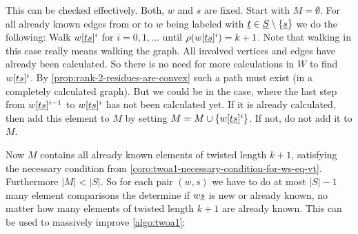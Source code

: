 This can be checked effectively. Both, $w$ and $s$ are fixed. Start with $M = \emptyset$. For all already known edges from or to $w$ being labeled with $\underline{t} \in \underline{S} \setminus \{\underline{s}\}$ we do the following: Walk $w[\underline{t} \underline{s}]^i$ for $i = 0,1,\ldots$ until $\rho(w[\underline{t} \underline{s}]^i) = k + 1$. Note that walking in this case really means walking the graph. All involved vertices and edges have already been calculated. So there is no need for more calculations in $W$ to find $w[\underline{t} \underline{s}]^i$. By \ref{prop:rank-2-residues-are-convex} such a path must exist (in a completely calculated graph). But we could be in the case, where the last step from $w[\underline{t} \underline{s}]^{i-1}$ to $w[\underline{t} \underline{s}]^{i}$ has not been calculated yet. If it is already calculated, then add this element to $M$ by setting $M = M \cup \{ w[\underline{t} \underline{s}]^{i} \}$. If not, do not add it to $M$.

Now $M$ contains all already known elements of twisted length $k+1$, satisfying the necessary condition from \ref{coro:twoa1-necessary-condition-for-ws-eq-vt}. Furthermore $|M| < |S|$. So for each pair $(w,s)$ we have to do at most $|S|-1$ many element comparisons the determine if $w \underline{s}$ is new or already known, no matter how many elements of twisted length $k+1$ are already known. This can be used to massively improve \ref{algo:twoa1}:

